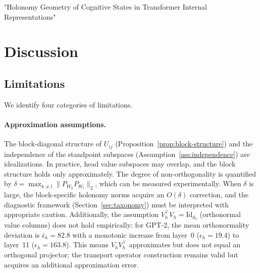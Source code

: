 "Holonomy Geometry of Cognitive States in Transformer Internal Representations"

\section{Discussion}
\label{sec:discussion}

\subsection{Limitations}

We identify four categories of limitations.

\paragraph{Approximation assumptions.}
The block-diagonal structure of $U_{ij}$ (Proposition~\ref{prop:block-structure}) and
the independence of the standpoint subspaces (Assumption~\ref{ass:independence}) are
idealizations. In practice, head value subspaces may overlap, and the block structure
holds only approximately. The degree of non-orthogonality is quantified by $\delta =
\max_{k \neq l} \|P_{W_k} P_{W_l}\|_2$, which can be measured experimentally. When
$\delta$ is large, the block-specific holonomy norms acquire an $O(\delta)$ correction,
and the diagnostic framework (Section~\ref{sec:taxonomy}) must be interpreted with
appropriate caution. Additionally, the assumption $V_h^\top V_h = \mathrm{Id}_{d_v}$
(orthonormal value columns) does not hold empirically: for GPT-2, the mean orthonormality
deviation is $\bar{\epsilon}_h = 82.8$ with a monotonic increase from layer~0
($\epsilon_h = 19.4$) to layer~11 ($\epsilon_h = 163.8$). This means $V_h V_h^\top$
approximates but does not equal an orthogonal projector; the transport operator
construction remains valid but acquires an additional approximation error.

